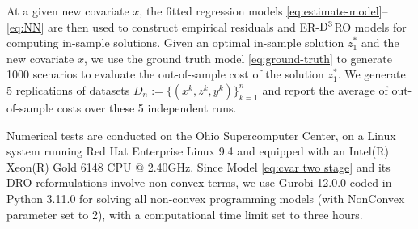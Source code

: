 \documentclass[onefignum,onetabnum]{siamart251216}
\begin{document}
At a given new covariate $x$, the fitted regression models \eqref{eq:estimate-model}--\eqref{eq:NN} are then used to construct empirical residuals and ER-${\rm D^3}$RO models for computing in-sample solutions. Given an optimal in-sample solution $z_1^*$ and the new covariate $x$, we use the ground truth model \eqref{eq:ground-truth} to generate 1000 scenarios to evaluate the out-of-sample cost of the solution $z_1^*$. We generate 5 replications of datasets $D_n:=\{(x^k,z^k,y^k)\}_{k=1}^n$ and report the average of out-of-sample costs over these 5 independent runs.

Numerical tests are conducted on the Ohio Supercomputer Center, on a Linux system running Red Hat Enterprise Linux 9.4 and equipped with an Intel(R) Xeon(R) Gold 6148 CPU @ 2.40GHz. Since Model \eqref{eq:cvar two stage} and its DRO reformulations involve non-convex terms, we use Gurobi 12.0.0 coded in Python 3.11.0 for solving all non-convex programming models (with NonConvex parameter set to 2), with a computational time limit set to three hours.
\end{document}
